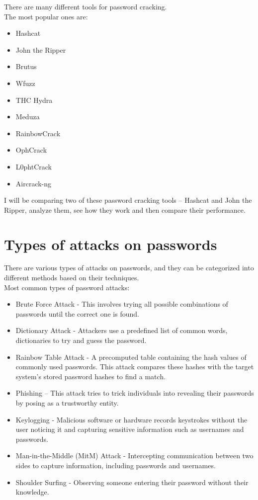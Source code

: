\documentclass[10pt,oneside,english,a4paper]{article}
\begin{document}
There are many different tools for password cracking.\\
The most popular ones are: 
\begin{multicols}{2}
\begin{itemize}
    \item Hashcat
    \item John the Ripper
    \item Brutus
    \item Wfuzz
    \item THC Hydra
\end{itemize}
\columnbreak
\begin{itemize}
    \item Meduza
    \item RainbowCrack
    \item OphCrack
    \item L0phtCrack
    \item Aircrack-ng
\end{itemize}
\end{multicols}

I will be comparing two of these password cracking tools – Hashcat and John the Ripper, analyze them, see how they work and then compare their performance. 


\section{Types of attacks on passwords}
There are various types of attacks on passwords, and they can be categorized into different methods based on their techniques. 
\\
Most common types of password attacks:
\begin{itemize}
\item Brute Force Attack - This involves trying all possible combinations of passwords until the correct one is found.
\item Dictionary Attack - Attackers use a predefined list of common words, dictionaries to try and guess the password.
\item Rainbow Table Attack - A precomputed table containing the hash values of commonly used passwords. This attack compares these hashes with the target system's stored password hashes to find a match.
\item Phishing – This attack tries to trick individuals into revealing their passwords by posing as a trustworthy entity.
\item Keylogging - Malicious software or hardware records keystrokes without the user noticing it and capturing sensitive information such as usernames and passwords.
\item Man-in-the-Middle (MitM) Attack - Intercepting communication between two sides to capture information, including passwords and usernames.
\item Shoulder Surfing - Observing someone entering their password without their knowledge.
\end{itemize}
\end{document}
